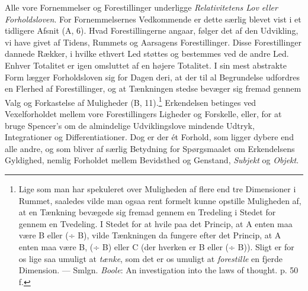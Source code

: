 \documentclass[12pt,a4paper,openany]{book}
\newcommand{\opage}[1]{\marginnote{\footnotesize\textit{[#1]}}}
\begin{document}
Alle vore Fornemmelser og Forestillinger underligge \emph{Relativitetens
Lov eller Forholdsloven}. For Fornemmelsernes Vedkommende er dette
særlig blevet vist i et tidligere Afsnit (A, 6). Hvad Forestillingerne
angaar, følger det af den Udvikling, vi have givet af Tidens, Rummets og
Aarsagens Forestillinger. Disse Forestillinger dannede Rækker, i hvilke
ethvert Led støttes og bestemmes ved de andre Led. Enhver Totalitet er
igen omsluttet af en højere Totalitet. I sin mest abstrakte Form lægger
Forholdsloven sig for Dagen deri, at der til al Begrundelse udfordres en
Flerhed af Forestillinger, og at Tænkningen stedse bevæger sig fremad
gennem
\opage{264}Valg og Forkastelse af Muligheder (B, 11).\footnote[1]{Lige
som man har spekuleret over Muligheden af flere end tre Dimensioner i
Rummet, saaledes vilde man ogsaa rent formelt kunne opstille Muligheden
af, at en Tænkning bevægede sig fremad gennem en Tredeling i Stedet for
gennem en Tvedeling. I Stedet for at hvile paa det Princip, at A enten
maa være B eller (÷ B), vilde Tænkningen da fungere efter det Princip,
at A enten maa være B, (÷ B) eller C (der hverken er B eller (÷ B)).
Sligt er for os lige saa umuligt at \emph{tænke}, som det er os umuligt
at \emph{forestille} en fjerde Dimension. --- Smlgn. \emph{Boole}: An
investigation into the laws of thought. p. 50 f.} Erkendelsen betinges
ved Vexelforholdet mellem vore Forestillingers Ligheder og Forskelle,
eller, for at bruge Spencer’s om de almindelige Udviklingslove mindende
Udtryk, Integrationer og Differentiationer. Dog er der ét Forhold, som
ligger dybere end alle andre, og som bliver af særlig Betydning for
Spørgsmaalet om Erkendelsens Gyldighed, nemlig Forholdet mellem
Bevidsthed og Genstand, \emph{Subjekt} og \emph{Objekt}.
\end{document}

